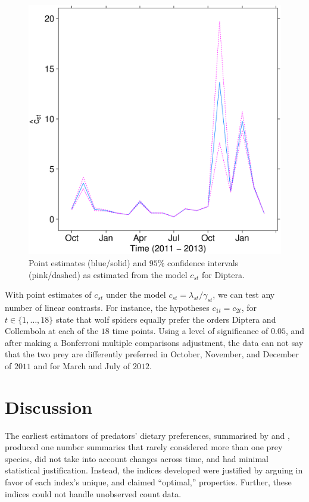 \documentclass[smallextended]{svjour3}
\begin{document}
\begin{figure}
  \centering
  \includegraphics[scale=0.35]{est_dipt}
  \caption{Point estimates (blue/solid) and $95\%$ confidence intervals (pink/dashed) as estimated from the model $c_{st}$ for Diptera.}
  \label{fig:est_dipt}
\end{figure}

With point estimates of $c_{st}$ under the model $c_{st} = \lambda_{st}/\gamma_{st}$, we can test any number of linear contrasts.  For instance, the hypotheses $c_{1t} = c_{2t}$, for $t \in \{1, \ldots, 18\}$ state that wolf spiders equally prefer the orders Diptera and Collembola at each of the $18$ time points.  Using a level of significance of $0.05$, and after making a Bonferroni multiple comparisons adjustment, the data can not say that the two prey are differently preferred in October, November, and December of $2011$ and for March and July of $2012$.

\section{Discussion}
\label{sec:discussion}

The earliest estimators of predators' dietary preferences, summarised by \citet{Lechowicz:1982} and \citet{Manly:2002}, produced one number summaries that rarely considered more than one prey species, did not take into account changes across time, and had minimal statistical justification.  Instead, the indices developed were justified by arguing in favor of each index's unique, and claimed ``optimal,'' properties.  Further, these indices could not handle unobserved count data.
\end{document}
